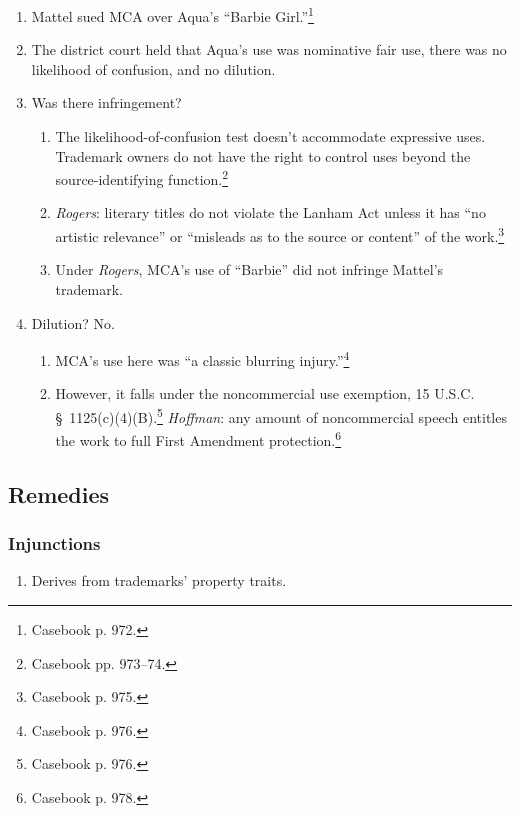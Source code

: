 \begin{enumerate}
    \item Mattel sued MCA over Aqua's ``Barbie Girl.''\footnote{Casebook p. 
    972.}
    \item The district court held that Aqua's use was nominative fair use, 
    there was no likelihood of confusion, and no dilution.
    \item Was there infringement?
    \begin{enumerate}
        \item The likelihood-of-confusion test doesn't accommodate expressive 
        uses. Trademark owners do not have the right to control uses beyond 
        the source-identifying function.\footnote{Casebook pp. 973--74.}
        \item \emph{Rogers}: literary titles do not violate the Lanham Act 
        unless it has ``no artistic relevance'' or ``misleads as to the source 
        or content'' of the work.\footnote{Casebook p. 975.}
        \item Under \emph{Rogers}, MCA's use of ``Barbie'' did not infringe 
        Mattel's trademark.
    \end{enumerate}
    \item Dilution? No.
    \begin{enumerate}
        \item MCA's use here was ``a classic blurring 
        injury.''\footnote{Casebook p. 976.}
        \item However, it falls under the noncommercial use exemption, 15 
        U.S.C. \S\ 1125(c)(4)(B).\footnote{Casebook p. 976.} \emph{Hoffman}: 
        any amount of noncommercial speech entitles the work to full First 
        Amendment protection.\footnote{Casebook p. 978.}
    \end{enumerate}
\end{enumerate}

\subsection{Remedies}

\subsubsection{Injunctions}

\begin{enumerate}
    \item Derives from trademarks' property traits.
\end{enumerate}

